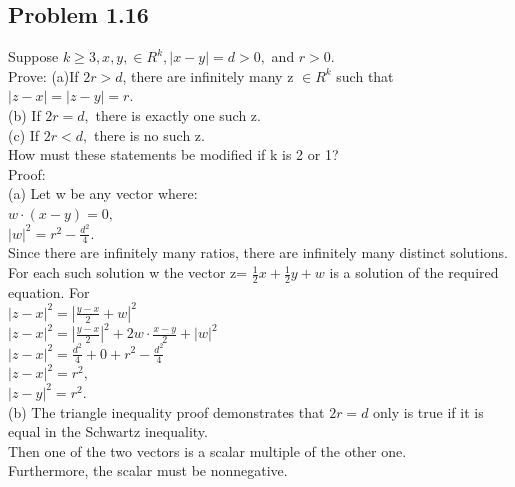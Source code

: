 \subsection*{Problem 1.16}
Suppose $k \geq 3, x,y,\in R^k, |x-y|=d>0,$ and $r>0.$ \\ Prove: 
(a)If $2r>d$, there are infinitely many z $\in R^k$ such that $|z-x|=|z-y|=r.$ \\ 
(b) If $2r = d,$ there is exactly one such z. \\ 
(c) If $2r < d,$ there is no such z. \\ 
How must these statements be modified if k is 2 or 1? \\ 
Proof: \\ 
(a) Let w be any vector where: \\ 
$w \cdot (x-y)=0,$ \\ 
$|w|^2 = r^2 - \frac{d^2}{4}.$ \\ 
Since there are infinitely many ratios, there are infinitely many distinct solutions. For each such solution w the vector z= $\frac{1}{2}x + \frac{1}{2}y + w$ is a solution of the required equation. For \\
$|z-x|^2= |\frac{y-x}{2}+w|^2$ \\ 
$|z-x|^2= |\frac{y-x}{2}|^2 +2w \cdot \frac{x-y}{2}+|w|^2$ \\ 
$|z-x|^2= \frac{d^2}{4}+0 +r^2 -\frac{d^2}{4}$ \\ 
$|z-x|^2 = r^2,$ \\
$|z-y|^2=r^2.$ \\ 
(b) The triangle inequality proof demonstrates that $2r=d$ only is true if it is equal in the Schwartz inequality.\\ Then one of the two vectors is a scalar multiple of the other one.\\ Furthermore, the scalar must be nonnegative. 
